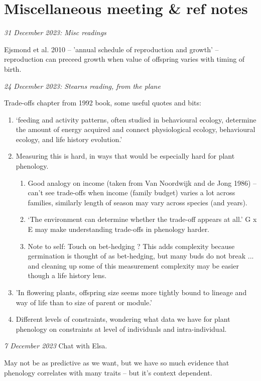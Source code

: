 \documentclass[11pt]{article}
\begin{document}
\clearpage
\section{Miscellaneous meeting \& ref notes}


\emph{31 December 2023: Misc readings}

Ejsmond et al. 2010 -- 'annual schedule of reproduction and growth' -- reproduction can preceed growth when value of offspring varies with timing of birth. 

\emph{24 December 2023: Stearns reading, from the plane}

Trade-offs chapter from 1992 book, some useful quotes and bits:
\begin{enumerate}
\item `feeding and activity patterns, often studied in behavioural ecology, determine the amount of energy acquired  and connect physiological ecology, behavioural ecology, and life history evolution.'
\item Measuring this is hard, in ways that would be especially hard for plant phenology.
\begin{enumerate}
\item Good analogy on income (taken from Van Noordwijk and de Jong 1986) -- can't see trade-offs when income (family budget) varies a lot across families, similarly length of season may vary across species (and years). 
\item `The environment can determine whether the trade-off appears at all.' G x E may make understanding trade-offs in phenology harder. 
\item Note to self: Touch on bet-hedging ? This adds complexity because germination is thought of as bet-hedging, but many buds do not break ... and cleaning up some of this measurement complexity may be easier though a life history lens. 
\end{enumerate}
\item 'In flowering plants, offspring size seems more tightly bound to lineage and way of life than to size of parent or module.'
\item Different levels of constraints, wondering what data we have for plant phenology on constraints at level of individuals and intra-individual. 
\end{enumerate}


\emph{7 December 2023} Chat with Elsa.

May not be as predictive as we want, but we have so much evidence that phenology correlates with many traits -- but it's context dependent. 
\end{document}
